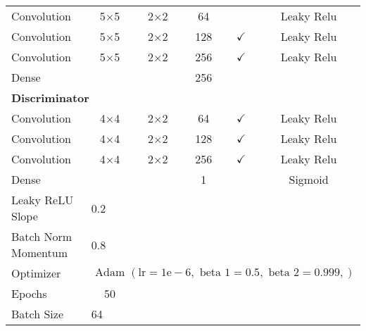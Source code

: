 \begin{longtable}[c]{@{}lccccc@{}}
	Convolution & \multicolumn{1}{c}{5$\times$5} & 2$\times$2 & 64 &  & Leaky Relu \\
	Convolution & \multicolumn{1}{c}{5$\times$5} & 2$\times$2 & 128 & $\checkmark$ & Leaky Relu \\
	Convolution & \multicolumn{1}{c}{5$\times$5} & 2$\times$2 & 256 & $\checkmark$ & Leaky Relu \\
	Dense & \multicolumn{1}{c}{} &  & 256 &  &  \\ 
	\multicolumn{6}{l}{\textbf{Discriminator}} \\
	Convolution & \multicolumn{1}{c}{4$\times$4} & 2$\times$2 & 64 & $\checkmark$ & Leaky Relu \\
	Convolution & \multicolumn{1}{c}{4$\times$4} & 2$\times$2 & 128 & $\checkmark$ & Leaky Relu \\
	Convolution & \multicolumn{1}{c}{4$\times$4} & 2$\times$2 & 256 & $\checkmark$ & Leaky Relu \\
	Dense & \multicolumn{1}{c}{} &  & 1 &  & Sigmoid \\ \hline
	Leaky ReLU Slope & \multicolumn{5}{l}{0.2} \\
	Batch Norm Momentum & \multicolumn{5}{l}{0.8} \\
	Optimizer & \multicolumn{5}{l}{$\text { Adam }(\mathrm{lr}=1 \mathrm{e}-6, \text { beta } 1=0.5, \text { beta } 2=0.999,)$} \\ \hline
	Epochs & 50 & \multicolumn{1}{l}{} & \multicolumn{1}{l}{} & \multicolumn{1}{l}{} & \multicolumn{1}{l}{} \\
	Batch Size & \multicolumn{5}{l}{64}
\end{longtable}



